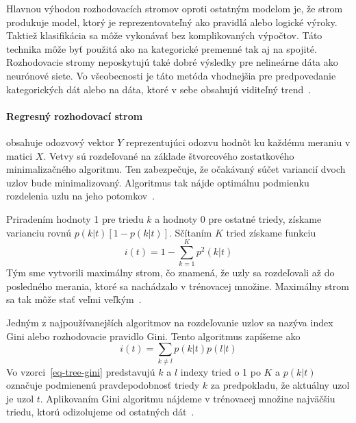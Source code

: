 \documentclass[a4paper,slovak,12pt,appendix]{article}
\begin{document}
Hlavnou výhodou rozhodovacích stromov oproti ostatným modelom je, že strom
produkuje model, ktorý je reprezentovateľný ako pravidlá alebo logické výroky.
Taktiež klasifikácia sa môže vykonávať bez komplikovaných výpočtov. Táto
technika môže byť použitá ako na kategorické premenné tak aj na spojité.
Rozhodovacie stromy neposkytujú také dobré výsledky pre nelineárne dáta ako
neurónové siete. Vo všeobecnosti je táto metóda vhodnejšia pre predpovedanie
kategorických dát alebo na dáta, ktoré v sebe obsahujú viditeľný
trend~\cite{Tso2007}.


\paragraph{Regresný rozhodovací strom} obsahuje odozvový vektor $Y$
reprezentujúci odozvu hodnôt ku každému meraniu v matici $X$. Vetvy sú
rozdeľované na základe štvorcového zostatkového minimalizačného algoritmu.
Ten zabezpečuje, že očakávaný súčet variancií dvoch uzlov bude minimalizovaný.
Algoritmus tak nájde optimálnu podmienku rozdelenia uzlu na jeho
potomkov~\cite{Bel2009}.

Priradením hodnoty 1 pre triedu $k$ a hodnoty 0 pre ostatné triedy, získame
varianciu rovnú $p(k|t)[1 - p(k|t)]$. Sčítaním $K$ tried získame funkciu
\begin{equation}
  i(t) = 1 - \sum_{k = 1}^K p^2 (k|t)
  \label{eq-tree-impurity}
\end{equation}
Tým sme vytvorili maximálny strom, čo znamená, že uzly sa rozdeľovali až do
posledného merania, ktoré sa nachádzalo v trénovacej množine. Maximálny strom
sa tak môže stať veľmi veľkým~\cite{Bel2009}.

Jedným z najpoužívanejších algoritmov na rozdeľovanie uzlov sa nazýva index
Gini alebo rozhodovacie pravidlo Gini. Tento algoritmus zapíšeme ako
\begin{equation}
  i(t) = \sum_{k \neq l} p(k|t) p(l|t)
  \label{eq-tree-gini}
\end{equation}
Vo vzorci~\ref{eq-tree-gini} predstavujú $k$ a $l$ indexy tried o 1 po $K$ a
$p(k|t)$ označuje podmienenú pravdepodobnosť triedy $k$ za predpokladu, že
aktuálny uzol je uzol $t$. Aplikovaním Gini algoritmu nájdeme v trénovacej
množine najväčšiu triedu, ktorú odizolujeme od ostatných dát~\cite{Bel2009}.
\end{document}
